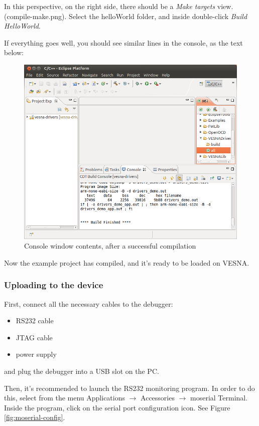 \documentclass[a4paper, 10pt]{article}
\begin{document}
In this perspective,
on the right side, there should be a \emph{Make targets} view. (compile-make.png).
Select the helloWorld folder, and inside double-click \emph{Build HelloWorld}.

If everything goes well, you should see similar lines in the console, as the text below:

    \begin{figure}[H]
    \centering
        \includegraphics[width=\textwidth]{./install-guide-linux-images/compile-result.png}
        \caption{Console window contents, after a successful compilation}
        \label{fig:compile-result}
    \end{figure}

Now the example project has compiled, and it's ready to be loaded on VESNA.

\subsubsection{Uploading to the device}

First, connect all the necessary cables to the debugger:
    \begin{itemize}
    \item RS232 cable
    \item JTAG cable
    \item power supply
    \end{itemize}
and plug the debugger into a USB slot on the PC.

Then, it's recommended to launch the RS232 monitoring program.
In order to do this, select from the menu
Applications $\rightarrow$ Accessories $\rightarrow$ moserial Terminal.
Inside the program, click on the serial port configuration icon.
See Figure \ref{fig:moserial-config}.
\end{document}
